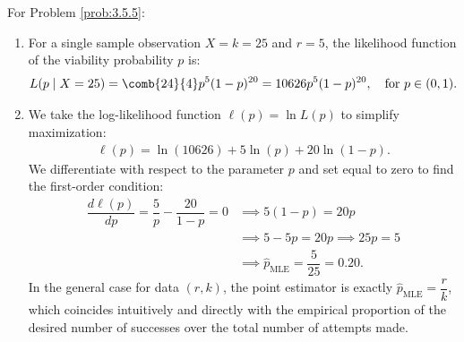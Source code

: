 \begin{solucion}
	\label{sol:3.5.5}
	For Problem \ref{prob:3.5.5}:
	\begin{enumerate}
		\item For a single sample observation $X = k = 25$ and $r = 5$, the likelihood function of the viability probability $p$ is:
		\begin{align*}
			L(p \mid X = 25) = \comb{24}{4} p^5 (1-p)^{20} = 10626 p^5 (1-p)^{20}, \quad \text{for } p \in (0, 1).
		\end{align*}
		\item We take the log-likelihood function $\ell(p) = \ln L(p)$ to simplify maximization:
		\begin{align*}
			\ell(p) = \ln(10626) + 5 \ln(p) + 20 \ln(1-p).
		\end{align*}
		We differentiate with respect to the parameter $p$ and set equal to zero to find the first-order condition:
		\begin{align*}
			\dfrac{d \ell(p)}{dp} = \dfrac{5}{p} - \dfrac{20}{1-p} = 0 &\implies 5(1-p) = 20p \\
			&\implies 5 - 5p = 20p \implies 25p = 5 \\
			&\implies \hat{p}_{\text{MLE}} = \dfrac{5}{25} = 0.20.
		\end{align*}
		In the general case for data $(r, k)$, the point estimator is exactly $\hat{p}_{\text{MLE}} = \dfrac{r}{k}$, which coincides intuitively and directly with the empirical proportion of the desired number of successes over the total number of attempts made.
	\end{enumerate}
\end{solucion}

